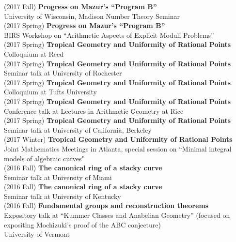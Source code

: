 \documentclass[margin,line]{res}
\begin{document}
\begin{resume}
(2017 Fall) \textbf{Progress on Mazur's ``Program B''}\\  
University of Wisconsin, Madison Number Theory Seminar
\vspace{.05cm}\\
(2017 Spring) \textbf{Progress on Mazur's ``Program B''}\\  
BIRS Workshop on ``Arithmetic Aspects of Explicit Moduli Problems''
\vspace{.05cm}\\
(2017 Spring) \textbf{Tropical Geometry and Uniformity of Rational Points}\\
Colloquium at Reed 
\vspace{.05cm}\\
(2017 Spring) \textbf{Tropical Geometry and Uniformity of Rational Points}\\
Seminar talk at University of Rochester
\vspace{.05cm}\\
(2017 Spring) \textbf{Tropical Geometry and Uniformity of Rational Points}\\
Colloquium at Tufts University 
\vspace{.05cm}\\
(2017 Spring) \textbf{Tropical Geometry and Uniformity of Rational Points}\\
Conference talk at Lectures in Arithmetic Geometry at Rice
\vspace{.05cm}\\
(2017 Spring) \textbf{Tropical Geometry and Uniformity of Rational Points}\\
Seminar talk at University of California, Berkeley
\vspace{.05cm}\\
(2017 Winter) \textbf{Tropical Geometry and Uniformity of Rational Points}\\
Joint Mathematics Meetings in Atlanta, special session on ``Minimal integral models of algebraic curves"  
\vspace{.05cm}\\
(2016 Fall) \textbf{The canonical ring of a stacky curve}\\  
Seminar talk at University of Miami
\vspace{.05cm}\\
(2016 Fall) \textbf{The canonical ring of a stacky curve}\\  
Seminar talk at University of Kentucky
\vspace{.05cm}\\
(2016 Fall) \textbf{Fundamental groups and reconstruction theorems}\\ Expository talk at ``Kummer Classes and Anabelian Geometry'' (focused on expositing Mochizuki's proof of the ABC conjecture)\\ University of Vermont  

\end{resume}
\end{document}
